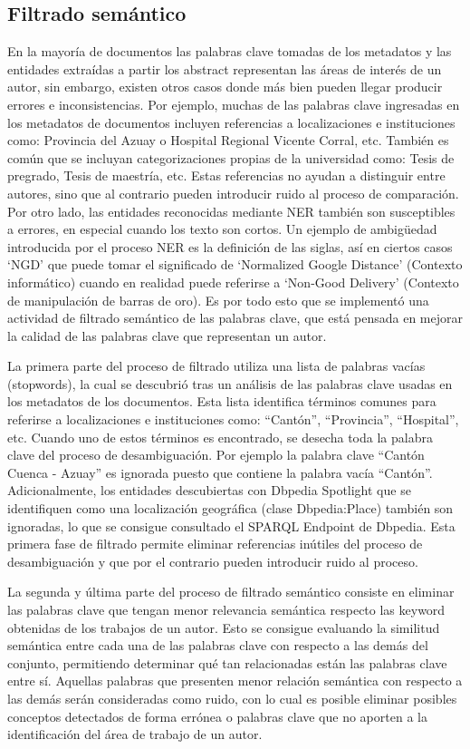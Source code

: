 \documentclass[conference]{IEEEtran}
\begin{document}
\subsection{Filtrado semántico}
En la mayoría de documentos las palabras clave tomadas de los metadatos y las entidades extraídas a partir los abstract representan las áreas de interés de un autor, sin embargo, existen otros casos donde más bien pueden llegar producir errores e inconsistencias. Por ejemplo, muchas de las palabras clave ingresadas en los metadatos de documentos incluyen referencias a localizaciones  e instituciones como: Provincia del Azuay o Hospital Regional Vicente Corral, etc. También es común que se incluyan categorizaciones propias de la universidad como: Tesis de pregrado, Tesis de maestría, etc. Estas referencias no ayudan a distinguir entre autores, sino que al contrario pueden introducir ruido al proceso de comparación. Por otro lado, las entidades reconocidas mediante NER también son susceptibles a errores, en especial cuando los texto son cortos. Un ejemplo de ambigüedad introducida por el proceso NER es la definición de las siglas, así en ciertos casos ‘NGD’ que puede tomar el significado de ‘Normalized Google Distance’ (Contexto informático) cuando en realidad puede referirse a ‘Non-Good Delivery’ (Contexto  de manipulación de barras de oro). Es por todo esto que se implementó una actividad de filtrado semántico de las palabras clave, que está pensada en mejorar la calidad de las palabras clave que representan un autor.

La primera parte del proceso de filtrado utiliza una lista de palabras vacías (stopwords), la cual se descubrió tras un análisis de las palabras clave usadas en los metadatos de los documentos. Esta lista identifica términos comunes para referirse a localizaciones e instituciones como: “Cantón”, “Provincia”, “Hospital”, etc. Cuando uno de estos términos es encontrado, se desecha toda la palabra clave del proceso de desambiguación. Por ejemplo la palabra clave “Cantón Cuenca - Azuay” es ignorada puesto que contiene la palabra vacía “Cantón”. Adicionalmente, los entidades descubiertas con Dbpedia Spotlight que se identifiquen como una localización geográfica (clase Dbpedia:Place) también son ignoradas, lo que se consigue consultado el SPARQL Endpoint de Dbpedia. Esta primera fase de filtrado permite eliminar referencias inútiles del proceso de desambiguación y que por el contrario pueden introducir ruido al proceso.

La segunda y última parte del proceso de filtrado semántico consiste en eliminar las palabras clave que tengan menor relevancia semántica respecto las keyword obtenidas de los trabajos de un autor. Esto se consigue evaluando la similitud semántica entre cada una de las palabras clave con respecto a las demás del conjunto, permitiendo  determinar qué tan relacionadas están las palabras clave entre sí. Aquellas palabras que presenten menor relación semántica con respecto a las demás serán consideradas como ruido, con lo cual es posible  eliminar posibles conceptos detectados de forma errónea o palabras clave que no aporten a la identificación del área de trabajo de un autor.
\end{document}
